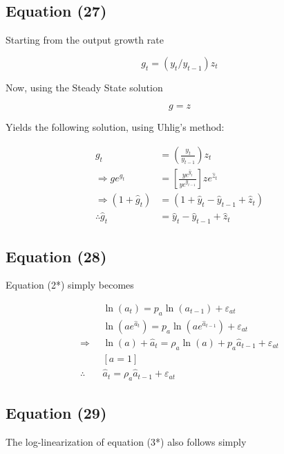 \documentclass[11pt,preprint, authoryear]{elsarticle}
\numberwithin{equation}{section}
\numberwithin{figure}{section}
\numberwithin{table}{section}
\begin{document}
\hypertarget{equation-27}{%
\subsection{Equation (27)}\label{equation-27}}

Starting from the output growth rate

\[g_{t}=\left(y_{t} / y_{t-1}\right) z_{t}\]

Now, using the Steady State solution

\[g = z\]

Yields the following solution, using Uhlig's method:

\[\begin{aligned}
g_{t}&=\left(\frac{y_{t}}{y_{t-1}}\right) z_{t}\\
\Rightarrow ge^{g_{t}}&=\left[\frac{y e^{\hat{y}_{t}}}{y e^{\hat{y}_{t-1}}}\right] z e^{\hat{z}_{t}}\\
\Rightarrow \left(1+\hat{g}_{t}\right)&=\left(1+\hat{y}_{t}-\hat{y}_{t-1}+\hat{z}_{t}\right)\\
\therefore \hat{g}_{t} &= \hat{y}_{t}-\hat{y}_{t-1}+\hat{z}_{t}
\end{aligned}\]

\hypertarget{equation-28}{%
\subsection{Equation (28)}\label{equation-28}}

Equation (2*) simply becomes

\[\begin{aligned}
& \ln \left(a_{t}\right)=p_{a} \ln \left(a_{t-1}\right)+\varepsilon_{a t} \\
& \ln \left(a e^{\hat{a}_{t}}\right)=p_{a} \ln \left(a e^{\hat{a}_{t-1}}\right)+\varepsilon_{a t} \\
\Rightarrow & \ln (a)+\hat{a}_{t}=\rho_{a} \ln (a)+p_{a} \hat{a}_{t-1}+\varepsilon_{a t} \\
&[a =1] \\
\therefore \quad & \hat{a}_{t} =\rho_{a} \hat{a}_{t-1}+\varepsilon_{a t}
\end{aligned}\]

\hypertarget{equation-29}{%
\subsection{Equation (29)}\label{equation-29}}

The log-linearization of equation (3*) also follows simply
\end{document}

